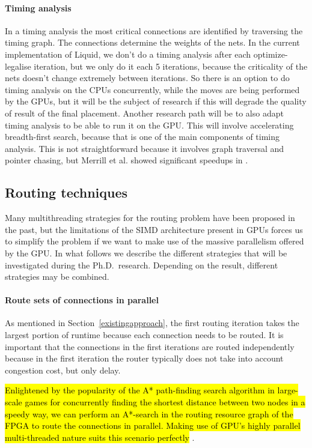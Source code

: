 \documentclass[a4paper,oneside,12pt]{article}
\begin{document}
\paragraph{Timing analysis}
In a timing analysis the most critical connections are identified by traversing the timing graph. The connections determine the weights of the nets.
In the current implementation of {\sc Liquid}, we don't do a timing analysis after each optimize-legalise iteration, but we only do it each 5 iterations, because the criticality of the nets doesn't change extremely between iterations.
So there is an option to do timing analysis on the CPUs concurrently, while the moves are being performed by the GPUs, but it will be the subject of research if this will degrade the quality of result of the final placement.
Another research path will be to also adapt timing analysis to be able to run it on the GPU. This will involve accelerating breadth-first search, because that is one of the main components of timing analysis. This is not straightforward because it involves graph traversal and pointer chasing, but Merrill et al. showed significant speedups in \cite{Merrill2015}.



\subsection{Routing techniques}\label{routetech}

Many multithreading strategies for the routing problem have been proposed in the past, but the limitations of the SIMD architecture present in GPUs forces us to simplify the problem if we want to make use of the massive parallelism offered by the GPU.
In what follows we describe the different strategies that will be investigated during the Ph.D.\ research. Depending on the result, different strategies may be combined.

\paragraph{Route sets of connections in parallel}
As mentioned in Section~\ref{existingapproach}, the first routing iteration takes the largest portion of runtime because each connection needs to be routed.
It is important that the connections in the first iterations are routed independently because in the first iteration the router typically does not take into account congestion cost, but only delay.

\hl{Enlightened by the popularity of the A* path-finding search algorithm in large-scale games for concurrently finding the shortest distance between two nodes in a speedy way, we can perform an A*-search in the routing resource graph of the FPGA to route the connections in parallel. Making use of GPU's highly parallel multi-threaded nature suits this scenario perfectly} \cite{bleiweiss2008gpu,bleiweiss2012system}.
\end{document}
